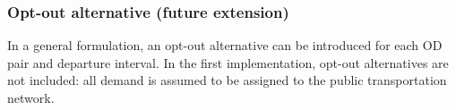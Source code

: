 \subsubsection{Opt-out alternative (future extension)}

In a general formulation, an opt-out alternative can be introduced for each OD pair and departure interval. In the first implementation,
opt-out alternatives are not included: all demand is assumed to be assigned to the public transportation network.

